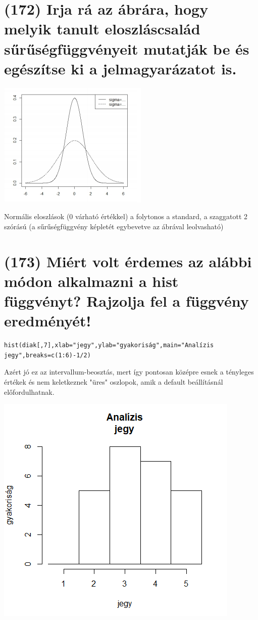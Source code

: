 \documentclass[12p]{article}
\begin{document}
\section{(172) Irja rá az ábrára, hogy melyik tanult eloszláscsalád sűrűségfüggvényeit mutatják be és
egészítse ki a jelmagyarázatot is.}

\includegraphics{fuggveny}

 Normális eloszlások (0 várható értékkel) a folytonos a standard, a szaggatott 2 szórású
(a sűrűségfüggvény képletét egybevetve az ábrával leolvasható)


\section{(173) Miért volt érdemes az alábbi módon alkalmazni a hist függvényt? Rajzolja fel a függvény eredményét! }

\begin{verbatim}
hist(diak[,7],xlab="jegy",ylab="gyakoriság",main="Analízis
jegy",breaks=c(1:6)-1/2)
\end{verbatim}

Azért jó ez az intervallum-beosztás, mert így pontosan középre esnek a tényleges értékek
és nem keletkeznek "üres" oszlopok, amik a default beállításnál előfordulhatnak.

\includegraphics{histogram}
\end{document}

